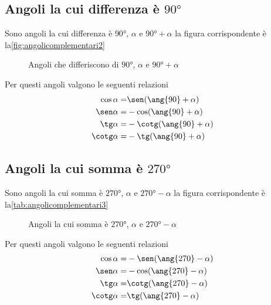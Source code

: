 \subsection{Angoli la cui differenza è $\ang{90}$}
Sono angoli la cui differenza è $\ang{90}$, $\alpha$ e $\ang{90}+\alpha$ la figura corrispondente è la\nobs\vref{fig:angolicomplementari2}
\begin{figure}[H]
	\centering
	
\caption{Angoli che differiscono di $\ang{90}$, $\alpha$ e $\ang{90}+\alpha$}
\label{fig:angolicomplementari2}
\end{figure}
Per questi angoli valgono le seguenti relazioni
\begin{align*}
\cos\alpha=&{}\sen(\ang{90}+\alpha)\\
\sen\alpha=&{}-\cos(\ang{90}+\alpha)\\
\tg\alpha=&{}-\cotg(\ang{90}+\alpha)\\
\cotg\alpha=&{}-\tg(\ang{90}+\alpha)
\end{align*}
\subsection{Angoli la cui somma è $\ang{270}$}
Sono angoli la cui somma è $\ang{270}$, $\alpha$ e $\ang{270}-\alpha$ la figura corrispondente è la\nobs\vref{tab:angolicomplementari3}
\begin{figure}[H]
	\centering
		
		\caption{Angoli la cui somma è $\ang{270}$,  $\alpha$ e $\ang{270}-\alpha$}
		\label{tab:angolicomplementari3}
\end{figure}
Per questi angoli valgono le seguenti relazioni
\begin{align*}
\cos\alpha=&{}-\sen(\ang{270}-\alpha)\\
\sen\alpha=&{}-\cos(\ang{270}-\alpha)\\
\tg\alpha=&{}\cotg(\ang{270}-\alpha)\\
\cotg\alpha=&{}\tg(\ang{270}-\alpha)
\end{align*}

